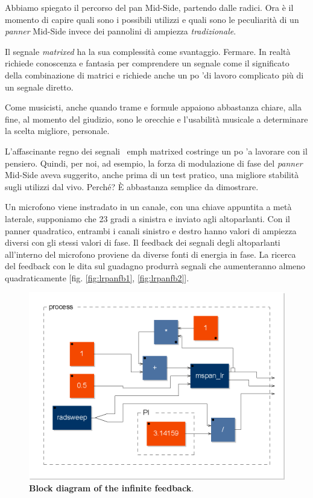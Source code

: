 Abbiamo spiegato il percorso del pan Mid-Side, partendo dalle radici. Ora è il
momento di capire quali sono i possibili utilizzi e quali sono le peculiarità di
un \emph{panner} Mid-Side invece dei pannolini di ampiezza \emph{tradizionale}.

Il segnale \emph{matrixed} ha la sua complessità come svantaggio. Fermare. In
realtà richiede conoscenza e fantasia per comprendere un segnale come il
significato della combinazione di matrici e richiede anche un po 'di lavoro
complicato più di un segnale diretto.

Come musicisti, anche quando trame e formule appaiono abbastanza chiare, alla
fine, al momento del giudizio, sono le orecchie e l'usabilità musicale a
determinare la scelta migliore, personale.

L'affascinante regno dei segnali \ emph {matrixed} costringe un po 'a lavorare
con il pensiero. Quindi, per noi, ad esempio, la forza di modulazione di fase
del \emph{panner} Mid-Side aveva suggerito, anche prima di un test pratico, una
migliore stabilità sugli utilizzi dal vivo. Perché? È abbastanza semplice da
dimostrare.

Un microfono viene instradato in un canale, con una chiave appuntita a metà
laterale, supponiamo che 23 gradi a sinistra e inviato agli altoparlanti. Con il
panner quadratico, entrambi i canali sinistro e destro hanno valori di ampiezza
diversi con gli stessi valori di fase. Il feedback dei segnali degli
altoparlanti all'interno del microfono proviene da diverse fonti di energia in
fase. La ricerca del feedback con le dita sul guadagno produrrà segnali che
aumenteranno almeno quadraticamente [fig. \ref{fig:lrpanfb1}, \ref{fig:lrpanfb2}].

\begin{figure}[h]
\centering
\includegraphics[width=1\columnwidth]{CAPITOLI/1000/IMG/mspanlrfb_diagram}
\caption{\textbf{Block diagram of the infinite feedback}.}
\label{fig:mspanlrfbdiag}
\end{figure}

